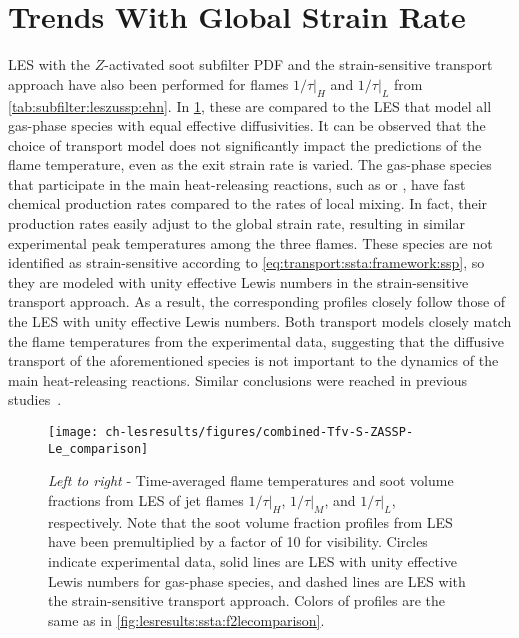 \section{Trends With Global Strain Rate}
\label{sec:lesresults:strain}

LES with the $Z$-activated soot subfilter PDF and the strain-sensitive transport approach have also been performed for flames $1/\tau|_H$ and $1/\tau|_L$ from \cref{tab:subfilter:leszussp:ehn}. In \cref{fig:lesresults:strain:allflameslecomparison}, these are compared to the LES that model all gas-phase species with equal effective diffusivities. It can be observed that the choice of transport model does not significantly impact the predictions of the flame temperature, even as the exit strain rate is varied. The gas-phase species that participate in the main heat-releasing reactions, such as  or , have fast chemical production rates compared to the rates of local mixing. In fact, their production rates easily adjust to the global strain rate, resulting in similar experimental peak temperatures among the three flames. These species are not identified as strain-sensitive according to \cref{eq:transport:ssta:framework:ssp}, so they are modeled with unity effective Lewis numbers in the strain-sensitive transport approach. As a result, the corresponding profiles closely follow those of the LES with unity effective Lewis numbers. Both transport models closely match the flame temperatures from the experimental data, suggesting that the diffusive transport of the aforementioned species is not important to the dynamics of the main heat-releasing reactions. Similar conclusions were reached in previous studies~\cite{attili2015,attili2016}.

\begin{figure}[htb]
  \centering
  \texttt{[image: ch-lesresults/figures/combined-Tfv-S-ZASSP-Le\_comparison]}
  \caption[Centerline \texorpdfstring{$\langle T \rangle$}{<T>} \& \texorpdfstring{$\langle f_V \rangle$}{<fV>} from LES of Flames \texorpdfstring{$1/\tau|_H$}{1/t|H}, \texorpdfstring{$1/\tau|_M$}{1/t|M}, and \texorpdfstring{$1/\tau|_L$}{1/t|L} with Various Transport Approaches]{\textit{Left to right} - Time-averaged flame temperatures and soot volume fractions from LES of jet flames $1/\tau|_H$, $1/\tau|_M$, and $1/\tau|_L$, respectively. Note that the soot volume fraction profiles from LES have been premultiplied by a factor of 10 for visibility. Circles indicate experimental data, solid lines are LES with unity effective Lewis numbers for gas-phase species, and dashed lines are LES with the strain-sensitive transport approach. Colors of profiles are the same as in \cref{fig:lesresults:ssta:f2lecomparison}.}
  \label{fig:lesresults:strain:allflameslecomparison}
\end{figure}

